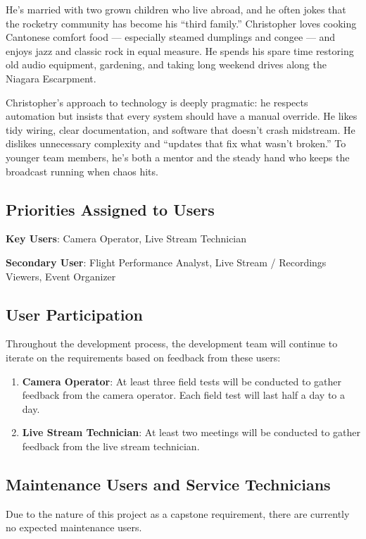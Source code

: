 \documentclass[12pt]{article}
\begin{document}
He's married with two grown children who live abroad, and he often jokes that
the rocketry community has become his “third family.” Christopher loves cooking
Cantonese comfort food — especially steamed dumplings and congee — and enjoys
jazz and classic rock in equal measure. He spends his spare time restoring old
audio equipment, gardening, and taking long weekend drives along the Niagara
Escarpment.

Christopher's approach to technology is deeply pragmatic: he respects
automation but insists that every system should have a manual override. He
likes tidy wiring, clear documentation, and software that doesn't crash
midstream. He dislikes unnecessary complexity and “updates that fix what wasn't
broken.” To younger team members, he's both a mentor and the steady hand who
keeps the broadcast running when chaos hits.
\subsection{Priorities Assigned to Users}

\textbf{Key Users}: Camera Operator, Live Stream Technician

\textbf{Secondary User}: Flight Performance Analyst, Live Stream / Recordings Viewers, Event Organizer

\subsection{User Participation}

Throughout the development process, the development team will continue to
iterate on the requirements based on feedback from these users:

\begin{enumerate}
  \item \textbf{Camera Operator}: At least three field tests will be conducted
        to gather feedback from the camera operator. Each field test will last
        half a day to a day.
  \item \textbf{Live Stream Technician}: At least two meetings will be conducted
        to gather feedback from the live stream technician.
\end{enumerate}

\subsection{Maintenance Users and Service Technicians}

Due to the nature of this project as a capstone requirement, there are
currently no expected maintenance users.
\end{document}
